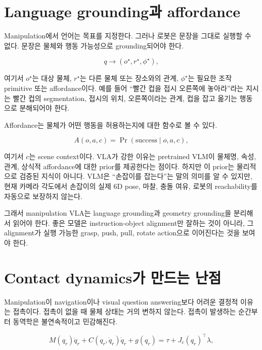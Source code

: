 \section{Language grounding과 affordance}

Manipulation에서 언어는 목표를 지정한다. 그러나 로봇은 문장을 그대로 실행할 수 없다. 문장은 물체와 행동 가능성으로 grounding되어야 한다.

\begin{equation}
  q
  \rightarrow
  \left(
    o^\star,
    r^\star,
    \phi^\star
  \right),
\end{equation}

여기서 $o^\star$는 대상 물체, $r^\star$는 다른 물체 또는 장소와의 관계, $\phi^\star$는 필요한 조작 primitive 또는 affordance이다. 예를 들어 ``빨간 컵을 접시 오른쪽에 놓아라''라는 지시는 빨간 컵의 segmentation, 접시의 위치, 오른쪽이라는 관계, 컵을 잡고 옮기는 행동으로 분해되어야 한다.

Affordance는 물체가 어떤 행동을 허용하는지에 대한 함수로 볼 수 있다.

\begin{equation}
  A(o, a, c)
  =
  \Pr(\mathrm{success} \mid o, a, c),
\end{equation}

여기서 $c$는 scene context이다. VLA가 강한 이유는 pretrained VLM이 물체명, 속성, 관계, 상식적 affordance에 대한 prior를 제공한다는 점이다. 하지만 이 prior는 물리적으로 검증된 지식이 아니다. VLM은 ``손잡이를 잡는다''는 말의 의미를 알 수 있지만, 현재 카메라 각도에서 손잡이의 실제 6D pose, 마찰, 충돌 여유, 로봇의 reachability를 자동으로 보장하지 않는다.

그래서 manipulation VLA는 language grounding과 geometry grounding을 분리해서 읽어야 한다. 좋은 모델은 instruction-object alignment만 잘하는 것이 아니라, 그 alignment가 실행 가능한 grasp, push, pull, rotate action으로 이어진다는 것을 보여야 한다.

\section{Contact dynamics가 만드는 난점}

Manipulation이 navigation이나 visual question answering보다 어려운 결정적 이유는 접촉이다. 접촉이 없을 때 물체 상태는 거의 변하지 않는다. 접촉이 발생하는 순간부터 동역학은 불연속적이고 민감해진다.

\begin{equation}
  M(q_r)\ddot{q}_r + C(q_r,\dot{q}_r)\dot{q}_r + g(q_r)
  =
  \tau + J_c(q_r)^\top \lambda,
\end{equation}

